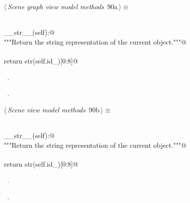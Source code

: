 \documentclass[
    a4paper,      %
    10pt,         %
    openright,    %
    notitlepage,  %
    parskip=half, %
]{scrreprt}       %
\theoremstyle{definition}                    %
\begin{document}
\begin{flushleft} \small
\begin{minipage}{\linewidth}\label{scrap143}\raggedright\small
{} $\langle\,${\itshape Scene graph view model methods}\nobreak\ {\footnotesize {90a}}$\,\rangle\equiv$
\vspace{-1exm}
\begin{list}{}{} \item
\mbox{}\lstinline@@\\
\mbox{}\lstinline@def __str__(self):@\\
\mbox{}\lstinline@    """Return the string representation of the current object."""@\\
\mbox{}\lstinline@@\\
\mbox{}\lstinline@    return str(self.id_)[0:8]@\\
\mbox{}\lstinline@@{\NWsep}
\end{list}
\vspace{-1.5ex}
\footnotesize
\begin{list}{}{\setlength{\itemsep}{-\parsep}\setlength{\itemindent}{-\leftmargin}}
\item \NWtxtMacroDefBy\ .
\item \NWtxtMacroRefIn\ .

\item{}
\end{list}
\end{minipage}\vspace{4ex}
\end{flushleft}
\begin{flushleft} \small
\begin{minipage}{\linewidth}\label{scrap144}\raggedright\small
{} $\langle\,${\itshape Scene view model methods}\nobreak\ {\footnotesize {90b}}$\,\rangle\equiv$
\vspace{-1exm}
\begin{list}{}{} \item
\mbox{}\lstinline@@\\
\mbox{}\lstinline@def __str__(self):@\\
\mbox{}\lstinline@    """Return the string representation of the current object."""@\\
\mbox{}\lstinline@@\\
\mbox{}\lstinline@    return str(self.id_)[0:8]@\\
\mbox{}\lstinline@@{\NWsep}
\end{list}
\vspace{-1.5ex}
\footnotesize
\begin{list}{}{\setlength{\itemsep}{-\parsep}\setlength{\itemindent}{-\leftmargin}}
\item \NWtxtMacroDefBy\ .
\item \NWtxtMacroRefIn\ .

\item{}
\end{list}
\end{minipage}\vspace{4ex}
\end{flushleft}
\end{document}

